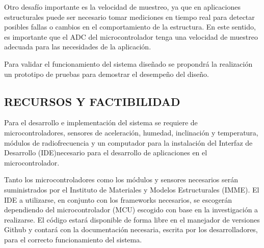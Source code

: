 \documentclass[12pt,letterpaper]{article}
\newcommand{\newfig}[4]{%
\begin{figure}[H]%
\centering%
\texttt{[image: \#2]}%
\caption{\emph{\small{#3}}}%
\label{fig:#4}
\end{figure}%
}
\begin{document}
Otro desafío importante es la velocidad de muestreo, ya que en aplicaciones estructurales puede ser necesario tomar mediciones en tiempo real para detectar posibles fallas o cambios en el comportamiento de la estructura. En este sentido, es importante que el ADC del microcontrolador tenga una velocidad de muestreo adecuada para las necesidades de la aplicación.

Para validar el funcionamiento del sistema diseñado se propondrá la realización un prototipo de pruebas para demostrar el desempeño del diseño.





\newpage

\begin{center}
	\section*{ RECURSOS Y FACTIBILIDAD}
\end{center}

Para el desarrollo e implementación del sistema se requiere de microcontroladores, sensores de aceleración, humedad, inclinación y temperatura, módulos de radiofrecuencia y un computador para la instalación del Interfaz de Desarrollo (IDE)necesario para el desarrollo de aplicaciones en el microcontrolador.

Tanto los microcontroladores como los módulos y sensores necesarios serán suministrados por el Instituto de Materiales y Modelos Estructurales (IMME). El IDE a utilizarse, en conjunto con los frameworks necesarios, se escogerán dependiendo del microcontrolador (MCU) escogido con base en la investigación a realizarse. El código estará disponible de forma libre en el manejador de versiones Github y contará con la documentación necesaria, escrita por los desarrolladores, para el correcto funcionamiento del sistema.

\newpage
\end{document}
